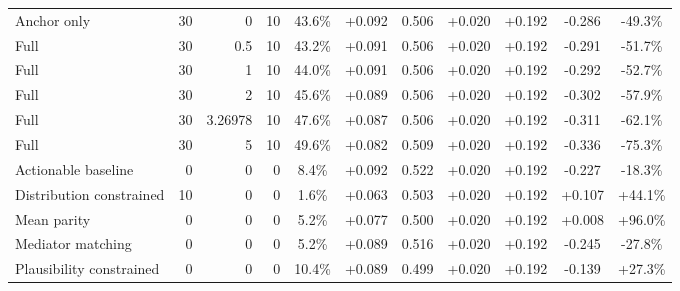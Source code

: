 \begin{table}[htbp]
\begin{tabular}{lrrrccccccc}
Anchor only & 30 & 0 & 10 & 43.6\% & +0.092 & 0.506 & +0.020 & +0.192 & -0.286 & -49.3\% \\
Full & 30 & 0.5 & 10 & 43.2\% & +0.091 & 0.506 & +0.020 & +0.192 & -0.291 & -51.7\% \\
Full & 30 & 1 & 10 & 44.0\% & +0.091 & 0.506 & +0.020 & +0.192 & -0.292 & -52.7\% \\
Full & 30 & 2 & 10 & 45.6\% & +0.089 & 0.506 & +0.020 & +0.192 & -0.302 & -57.9\% \\
Full & 30 & 3.26978 & 10 & 47.6\% & +0.087 & 0.506 & +0.020 & +0.192 & -0.311 & -62.1\% \\
Full & 30 & 5 & 10 & 49.6\% & +0.082 & 0.509 & +0.020 & +0.192 & -0.336 & -75.3\% \\
Actionable baseline & 0 & 0 & 0 & 8.4\% & +0.092 & 0.522 & +0.020 & +0.192 & -0.227 & -18.3\% \\
Distribution constrained & 10 & 0 & 0 & 1.6\% & +0.063 & 0.503 & +0.020 & +0.192 & +0.107 & +44.1\% \\
Mean parity & 0 & 0 & 0 & 5.2\% & +0.077 & 0.500 & +0.020 & +0.192 & +0.008 & +96.0\% \\
Mediator matching & 0 & 0 & 0 & 5.2\% & +0.089 & 0.516 & +0.020 & +0.192 & -0.245 & -27.8\% \\
Plausibility constrained & 0 & 0 & 0 & 10.4\% & +0.089 & 0.499 & +0.020 & +0.192 & -0.139 & +27.3\% \\
\bottomrule
\end{tabular}
\end{table}